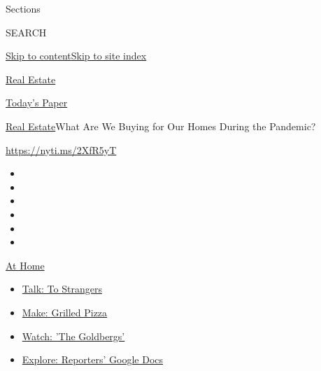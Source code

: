 Sections

SEARCH

\protect\hyperlink{site-content}{Skip to
content}\protect\hyperlink{site-index}{Skip to site index}

\href{https://www.nytimes3xbfgragh.onion/section/realestate}{Real
Estate}

\href{https://myaccount.nytimes3xbfgragh.onion/auth/login?response_type=cookie\&client_id=vi}{}

\href{https://www.nytimes3xbfgragh.onion/section/todayspaper}{Today's
Paper}

\href{/section/realestate}{Real Estate}\textbar{}What Are We Buying for
Our Homes During the Pandemic?

\url{https://nyti.ms/2XfR5yT}

\begin{itemize}
\item
\item
\item
\item
\item
\item
\end{itemize}

\href{https://www.nytimes3xbfgragh.onion/spotlight/at-home?action=click\&pgtype=Article\&state=default\&region=TOP_BANNER\&context=at_home_menu}{At
Home}

\begin{itemize}
\tightlist
\item
  \href{https://www.nytimes3xbfgragh.onion/2020/08/03/well/family/the-benefits-of-talking-to-strangers.html?action=click\&pgtype=Article\&state=default\&region=TOP_BANNER\&context=at_home_menu}{Talk:
  To Strangers}
\item
  \href{https://www.nytimes3xbfgragh.onion/2020/08/01/at-home/coronavirus-make-pizza-on-a-grill.html?action=click\&pgtype=Article\&state=default\&region=TOP_BANNER\&context=at_home_menu}{Make:
  Grilled Pizza}
\item
  \href{https://www.nytimes3xbfgragh.onion/2020/07/31/arts/television/goldbergs-abc-stream.html?action=click\&pgtype=Article\&state=default\&region=TOP_BANNER\&context=at_home_menu}{Watch:
  'The Goldbergs'}
\item
  \href{https://www.nytimes3xbfgragh.onion/interactive/2020/at-home/even-more-reporters-editors-diaries-lists-recommendations.html?action=click\&pgtype=Article\&state=default\&region=TOP_BANNER\&context=at_home_menu}{Explore:
  Reporters' Google Docs}
\end{itemize}

